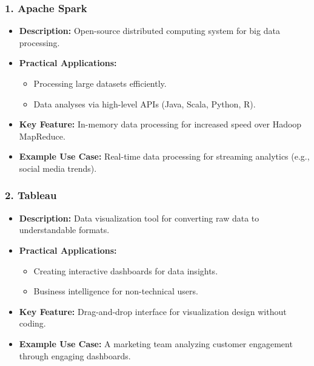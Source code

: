 \documentclass[aspectratio=169]{beamer}
\begin{document}
\begin{frame}[fragile]
    \frametitle{1. Apache Spark}
    \begin{itemize}
        \item \textbf{Description:} Open-source distributed computing system for big data processing.
        \item \textbf{Practical Applications:}
        \begin{itemize}
            \item Processing large datasets efficiently.
            \item Data analyses via high-level APIs (Java, Scala, Python, R).
        \end{itemize}
        \item \textbf{Key Feature:} In-memory data processing for increased speed over Hadoop MapReduce.
        \item \textbf{Example Use Case:} Real-time data processing for streaming analytics (e.g., social media trends).
    \end{itemize}
\end{frame}

\begin{frame}[fragile]
    \frametitle{2. Tableau}
    \begin{itemize}
        \item \textbf{Description:} Data visualization tool for converting raw data to understandable formats.
        \item \textbf{Practical Applications:}
        \begin{itemize}
            \item Creating interactive dashboards for data insights.
            \item Business intelligence for non-technical users.
        \end{itemize}
        \item \textbf{Key Feature:} Drag-and-drop interface for visualization design without coding.
        \item \textbf{Example Use Case:} A marketing team analyzing customer engagement through engaging dashboards.
    \end{itemize}
\end{frame}
\end{document}
